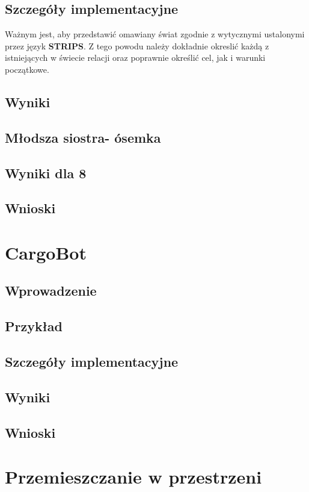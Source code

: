     \subsection{Szczegóły implementacyjne}
    Ważnym jest, aby przedstawić omawiany świat zgodnie z wytycznymi ustalonymi przez język \textbf{STRIPS}. Z tego powodu należy dokładnie okreslić 
    każdą z istniejących w świecie relacji oraz poprawnie określić cel, jak i warunki początkowe.

    \subsection{Wyniki}

    \subsection{Młodsza siostra- ósemka}

    \subsection{Wyniki dla 8}
    \subsection{Wnioski}
\section{CargoBot}
    \subsection{Wprowadzenie}
    \subsection{Przykład}
    \subsection{Szczegóły implementacyjne}
    \subsection{Wyniki}
    \subsection{Wnioski}
\section{Przemieszczanie w przestrzeni}
